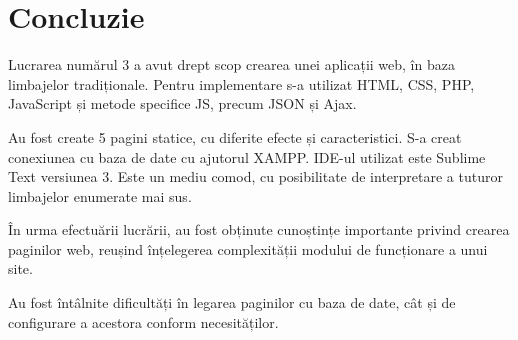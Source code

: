 \section*{Concluzie}

	Lucrarea numărul 3 a avut drept scop crearea unei aplicații web, în baza limbajelor tradiționale. Pentru implementare s-a utilizat HTML, CSS, PHP, JavaScript și metode specifice JS, precum JSON și Ajax. 
	
	Au fost create 5 pagini statice, cu diferite efecte și caracteristici. S-a creat conexiunea cu baza de date cu ajutorul XAMPP. IDE-ul utilizat este Sublime Text versiunea 3. Este un mediu comod, cu posibilitate de interpretare a tuturor limbajelor enumerate mai sus.
	
	În urma efectuării lucrării, au fost obținute cunoștințe importante privind crearea paginilor web, reușind înțelegerea complexității modului de funcționare a unui site.
	
	Au fost întâlnite dificultăți în legarea paginilor cu baza de date, cât și de configurare a acestora conform necesităților.

\clearpage